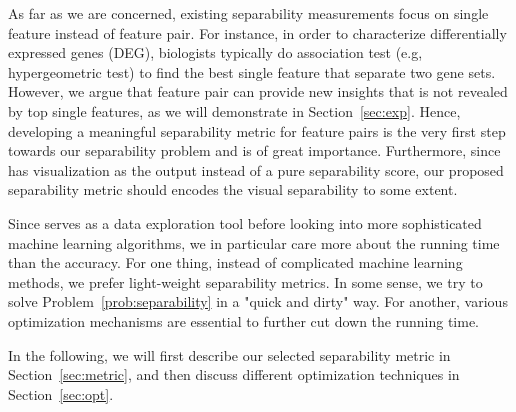  As far as we are concerned, existing separability measurements focus on single feature instead of feature pair. For instance, in order to characterize differentially expressed genes (DEG), biologists typically do association test (e.g, hypergeometric test) to find the best single feature that separate two gene sets. However, we argue that feature pair can provide new insights that is not revealed by top single features, as we will demonstrate in Section~\ref{sec:exp}. Hence, developing a meaningful separability metric for feature pairs is the very first step towards our separability problem and is of great importance. Furthermore, since \genviz has visualization as the output instead of a pure separability score, our proposed separability metric should encodes the visual separability to some extent. 

 Since \genviz serves as a data exploration tool before looking into more sophisticated machine learning algorithms, we in particular care more about the running time than the accuracy. For one thing, instead of complicated machine learning methods, we prefer light-weight separability metrics. In some sense, we try to solve Problem~\ref{prob:separability} in a "quick and dirty" way. For another, various optimization mechanisms are essential to further cut down the running time.

In the following, we will first describe our selected separability metric in Section~\ref{sec:metric}, and then discuss different optimization techniques in Section~\ref{sec:opt}.

